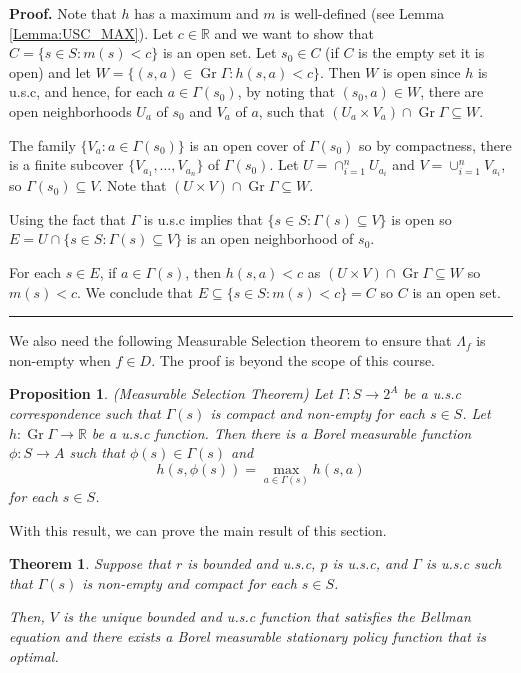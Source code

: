 \documentclass[letter,11pt]{article}
\newtheorem{theorem}{Theorem}[section]
\newtheorem{proposition}{Proposition}[section]
\newenvironment {proof}[1][Proof]{\noindent \textbf {#1.} }{\ \rule {0.5em}{0.5em}}
\begin{document}
\begin{proof}
    Note that $h$ has a maximum and $m$ is well-defined (see Lemma \ref{Lemma:USC_MAX}). Let $c \in \mathbb{R}$ and we want to show that $C = \{s \in S: m(s) < c\}$ is an open set. 
 Let $s_{0} \in C$ (if $C$ is the empty set it is open) and let $W = \{ (s,a) \in \operatorname{Gr} \Gamma: h(s,a) < c \}$. Then $W$ is open since $h$ is u.s.c, and hence, for each $a \in \Gamma (s_{0})$, by noting that $(s_{0},a) \in W$,  there are open neighborhoods $U_{a}$ of $s_{0}$ and $V_{a}$ of $a$, such that $(U_{a} \times V_{a} ) \cap \operatorname{Gr} \Gamma \subseteq W$. 
 
 The family $\{V_{a}:a \in \Gamma(s_{0}) \}$ is an open cover of $\Gamma(s_{0})$ so by compactness, there is a finite subcover $\{V_{a_{1}}, \ldots , V_{a_{n} } \}$  of $\Gamma(s_{0})$. Let $U = \cap _{i=1}^{n} U_{a_{i}} $ and $V = \cup _{i=1}^{n} V_{a_{i}} $, so $\Gamma(s_{0}) \subseteq V$. Note that  $(U \times V ) \cap \operatorname{Gr} \Gamma \subseteq W$. 

    Using the fact that $\Gamma$ is u.s.c implies that $\{ s \in S : \Gamma(s) \subseteq V \}$ is open so $E = U \cap \{ s \in S : \Gamma(s) \subseteq V \}$ is an open neighborhood of $s_{0}$. 
    
    For each $s \in E$, if $a \in \Gamma(s)$, then $h(s,a) < c$ as $(U \times V ) \cap \operatorname{Gr} \Gamma \subseteq W$ so $m(s) < c$. We conclude that $E \subseteq \{s \in S: m(s) < c \}= C$ so $C$ is an open set. 
\end{proof}

We also need the following Measurable Selection theorem to ensure that $\Lambda_{f}$ is non-empty when $f \in D$. The proof is beyond the scope of this course. 

\begin{proposition} (Measurable Selection Theorem) \label{prop:selector}
     Let $\Gamma:S \rightarrow 2^{A}$ be a u.s.c correspondence such that $\Gamma(s)$ is compact and non-empty for each $s \in S$.  Let $h: \operatorname{Gr} \Gamma \rightarrow \mathbb {R}$ be a u.s.c function. Then there is a Borel measurable function $\phi: S \rightarrow A$ such that $\phi(s) \in \Gamma(s)$ and 
    $$ h(s, \phi(s)) = \max _{a \in \Gamma(s) } h(s,a) $$
    for each $s \in S$. 
\end{proposition}

With this result, we can prove the main result of this section. 

\begin{theorem}
    Suppose that $r$ is bounded and u.s.c, $p$ is u.s.c, and $\Gamma$ is u.s.c such that $\Gamma(s)$ is non-empty and compact for each $s \in S$. 

    Then, $V$ is the unique bounded and u.s.c function that satisfies the Bellman equation and there exists a Borel measurable stationary policy function that is optimal. 
\end{theorem}
\end{document}
